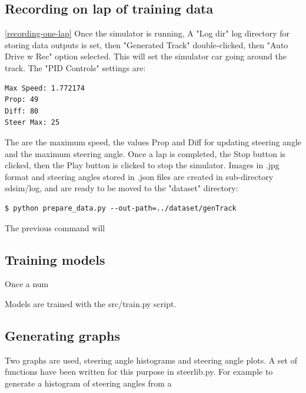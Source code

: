 \subsection{Recording on lap of training data}
\ref{recording-one-lap}
Once the simulator is running, A "Log dir" log directory for storing data outputs is set, then "Generated Track" double-clicked, then "Auto Drive w Rec" option selected. This will set the simulator car going around the track. 
The "PID Controls" settings are:
\begin{verbatim}
Max Speed: 1.772174
Prop: 49
Diff: 80
Steer Max: 25
\end{verbatim}
The are the maximum speed, the values Prop and Diff for updating steering angle and the maximum steering angle. Once a lap is completed, the Stop button is clicked, then the Play button is clicked to stop the simulator.  
Images in .jpg format and steering angles stored in .json files are created in sub-directory sdsim/log, and are ready to be moved to the "dataset" directory:
\begin{verbatim}
$ python prepare_data.py --out-path=../dataset/genTrack
\end{verbatim}
The previous command will 

\subsection{Training models}
Once a num

Models are trained with the src/train.py script.

\subsection{Generating graphs}

Two graphs are used, steering angle histograms and steering angle plots. A set of functions have been written for this purpose in steerlib.py. For example to generate a histogram of steering angles from a 









